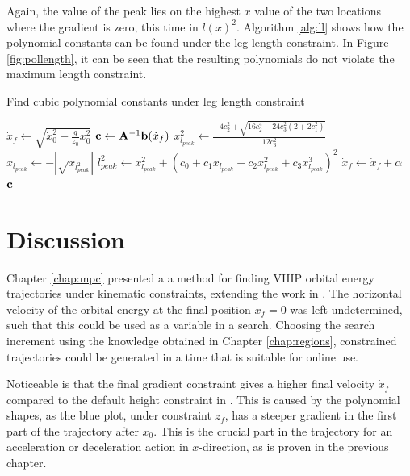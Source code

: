 Again, the value of the peak lies on the highest $x$ value of the two locations where the gradient is zero, this time in $l(x)^2$. Algorithm \ref{alg:ll} shows how the polynomial constants can be found under the leg length constraint. In Figure \ref{fig:pollength}, it can be seen that the resulting polynomials do not violate the maximum length constraint.
\begin{algorithm}
\caption{Find cubic polynomial constants under leg length constraint}
\label{alg:ll}
\begin{algorithmic}[1]
    \State $\dot{x}_{f}\gets \sqrt{\dot{x}_0^2-\frac{g}{z_0}x_0^2}$
        \Repeat
            \State $\mathbf{c}\gets \mathbf{A}^{-1}\mathbf{b}(\dot{x}_{f})$ 
            \State $x_{l_{peak}}^2 \gets \frac{-4c_2^2+\sqrt{16c_2^4-24c_3^2(2+2c_1^2)}}{12c_3^2}$   
            \State $x_{l_{peak}}\gets-|\sqrt{x_{l_{peak}^2}}|$                
            \State $l_{peak}^2 \gets x_{l_{peak}}^2 + (c_0 + c_1x_{l_{peak}} + c_2x_{l_{peak}}^2+ c_3x_{l_{peak}}^3)^2$ 
            \State $\dot{x}_{f} \gets \dot{x}_{f}+\alpha$   
        \\
    \Return $\mathbf{c}$    
\end{algorithmic}
\end{algorithm}
\section{Discussion}
Chapter \ref{chap:mpc} presented a a method for finding \ac{VHIP} orbital energy trajectories under kinematic constraints, extending the work in \cite{koolen2016balance}. The horizontal velocity of the orbital energy at the final position $x_f=0$ was left undetermined, such that this could be used as a variable in a search. Choosing the search increment using the knowledge obtained in Chapter \ref{chap:regions}, constrained trajectories could be generated in a time that is suitable for online use. 

Noticeable is that the final gradient constraint gives a higher final velocity $\dot{x}_f$ compared to the default height constraint in . This is caused by the polynomial shapes, as the blue plot, under constraint $z_f$, has a steeper gradient in the first part of the trajectory after $x_0$. This is the crucial part in the trajectory for an acceleration or deceleration action in $x$-direction, as is proven in the previous chapter.


